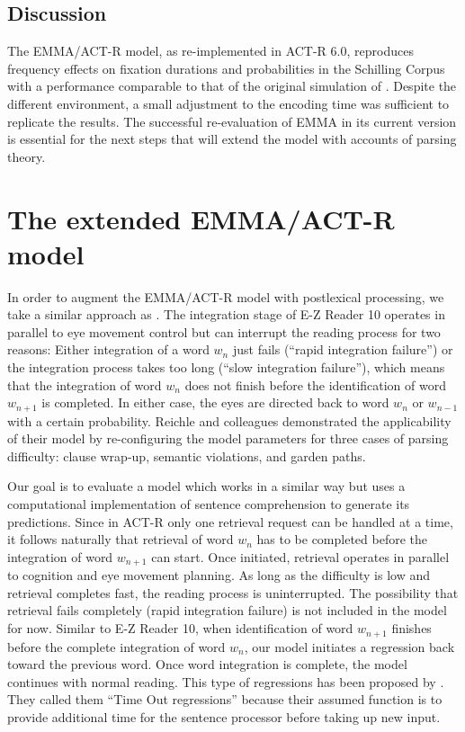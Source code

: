 \documentclass{cambridge7A}\usepackage[]{graphicx}\usepackage[]{color}
\begin{document}
\subsection{Discussion}
The EMMA/ACT-R model, as re-implemented in ACT-R 6.0, reproduces frequency effects on fixation durations and probabilities in the Schilling Corpus with a performance comparable to that of the original simulation of \cite{Salvucci2001}.  Despite the different environment, a small adjustment to the encoding time was sufficient to replicate the results.  
The successful re-evaluation of EMMA in its current version is essential for the next steps that will extend the model with accounts of parsing theory.

\section{The extended EMMA/ACT-R model} \label{sec:extensionemmaparser}
In order to augment the EMMA/ACT-R model with postlexical processing, we take a similar approach as \cite{ReichleWarrenMcConnell2009}.  The integration stage of E-Z Reader 10 operates in parallel to eye movement control but can interrupt the reading process for two reasons: Either integration of a word $w_n$ just fails (``rapid integration failure'') or the integration process takes too long (``slow integration failure''), which means that the integration of word $w_n$ does not finish before the identification of word $w_{n+1}$ is completed.
In either case, the eyes are directed back to word $w_n$ or $w_{n-1}$ with a certain probability.  
Reichle and colleagues demonstrated the applicability of their model by re-configuring the model parameters for three cases of parsing difficulty: clause wrap-up, semantic violations, and garden paths. 

Our goal is to evaluate a model which works in a similar way but uses a computational implementation of sentence comprehension to generate its predictions. 
Since in ACT-R only one retrieval request can be handled at a time, it follows naturally that retrieval of word $w_{n}$ has to be completed before the integration of word $w_{n+1}$ can start.  Once initiated, retrieval operates in parallel to cognition and eye movement planning. As long as the difficulty is low and retrieval completes fast, the reading process is uninterrupted.  The possibility that retrieval fails completely (rapid integration failure) is not included in the model for now.
Similar to E-Z Reader 10, when identification of word $w_{n+1}$ finishes before the complete integration of word $w_n$, our model initiates a regression back toward the previous word.  Once word integration is complete, the model continues with normal reading.  This type of regressions has been proposed by \cite{MitchellEtAl2008}.  They called them  ``Time Out regressions'' because their assumed function is to provide additional time for the sentence processor before taking up new input.
\end{document}
